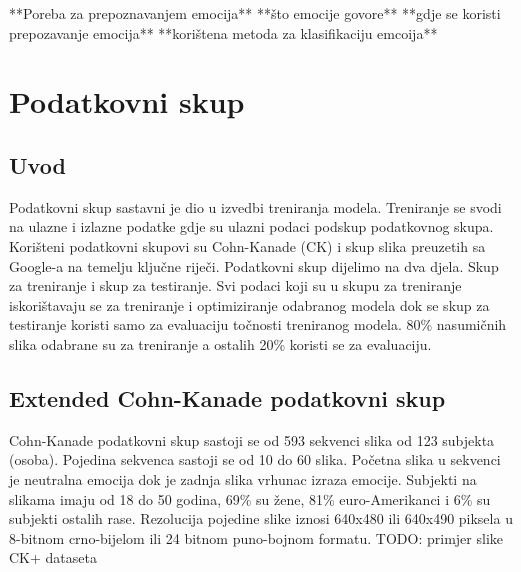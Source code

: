 \documentclass[times, utf8, zavrsni,numeric,pstricks]{fer}
\begin{document}
**Poreba za prepoznavanjem emocija**
**što emocije govore**
**gdje se koristi prepozavanje emocija**
**korištena metoda za klasifikaciju emcoija**



%



\chapter{Podatkovni skup}
\section{Uvod}
Podatkovni skup sastavni je dio u izvedbi treniranja modela. Treniranje se svodi na ulazne i izlazne podatke gdje su ulazni podaci podskup podatkovnog skupa. Korišteni podatkovni skupovi su Cohn-Kanade (CK) i skup slika preuzetih sa Google-a na temelju ključne riječi. Podatkovni skup dijelimo na dva djela. Skup za treniranje i skup za testiranje. Svi podaci koji su u skupu za treniranje iskorištavaju se za treniranje i optimiziranje odabranog modela dok se skup za testiranje koristi samo za evaluaciju točnosti treniranog modela. 80\% nasumičnih slika odabrane su za treniranje a ostalih 20\% koristi se za evaluaciju.

\section{Extended Cohn-Kanade podatkovni skup}

Cohn-Kanade podatkovni skup sastoji se od 593 sekvenci slika od 123 subjekta (osoba). Pojedina sekvenca sastoji se od 10 do 60 slika. Početna slika u sekvenci je neutralna emocija dok je zadnja slika vrhunac izraza emocije. Subjekti na slikama imaju od 18 do 50 godina, 69\% su žene, 81\% euro-Amerikanci i 6\% su subjekti ostalih rase. Rezolucija pojedine slike iznosi 640x480 ili 640x490 piksela u 8-bitnom crno-bijelom ili 24 bitnom puno-bojnom formatu\cite{ck}. TODO: primjer slike CK+ dataseta
\end{document}
